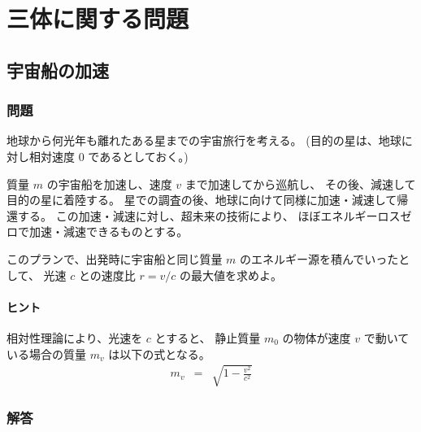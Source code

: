 \section{三体に関する問題}
\label{s:三体に関する問題}

\subsection{宇宙船の加速}
\label{ssec:宇宙船の加速}
\subsubsection{問題}
\label{sssec:宇宙船の加速:問題}

地球から何光年も離れたある星までの宇宙旅行を考える。
(目的の星は、地球に対し相対速度 0 であるとしておく。)

質量 $m$ の宇宙船を加速し、速度 $v$ まで加速してから巡航し、
その後、減速して目的の星に着陸する。
星での調査の後、地球に向けて同様に加速・減速して帰還する。
この加速・減速に対し、超未来の技術により、
ほぼエネルギーロスゼロで加速・減速できるものとする。

このプランで、出発時に宇宙船と同じ質量 $m$ のエネルギー源を積んでいったとして、
光速 $c$ との速度比 $r = v/c$ の最大値を求めよ。

\paragraph*{ヒント}
相対性理論により、光速を $c$ とすると、
静止質量 $m_0$ の物体が速度 $v$ で動いている場合の質量 $m_v$ は以下の式となる。
  \begin{eqnarray}
    m_v & = & \sqrt{1-\frac{v^2}{c^2}}
  \end{eqnarray}

\clearpage
\subsubsection{解答}
\label{sssec:宇宙船の加速:解答}

